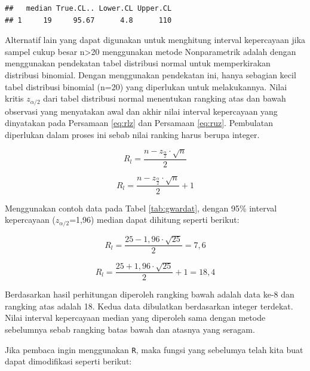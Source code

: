 \documentclass[]{book}
\newenvironment{Shaded}{\begin{snugshade}}{\end{snugshade}}
\newcommand{\KeywordTok}[1]{\textcolor[rgb]{0.13,0.29,0.53}{\textbf{#1}}}
\newcommand{\DataTypeTok}[1]{\textcolor[rgb]{0.13,0.29,0.53}{#1}}
\newcommand{\FloatTok}[1]{\textcolor[rgb]{0.00,0.00,0.81}{#1}}
\newcommand{\OperatorTok}[1]{\textcolor[rgb]{0.81,0.36,0.00}{\textbf{#1}}}
\newcommand{\NormalTok}[1]{#1}
\begin{document}
\begin{Shaded}
\end{Shaded}

\begin{verbatim}
##   median True.CL.. Lower.CL Upper.CL
## 1     19     95.67      4.8      110
\end{verbatim}

Alternatif lain yang dapat digunakan untuk menghitung interval
kepercayaan jika sampel cukup besar n\textgreater{}20 menggunakan metode
Nonparametrik adalah dengan menggunakan pendekatan tabel distribusi
normal untuk memperkirakan distribusi binomial. Dengan menggunakan
pendekatan ini, hanya sebagian kecil tabel distribusi binomial (n=20)
yang diperlukan untuk melakukannya. Nilai kritis \(z_{\alpha/2}\) dari
tabel distribusi normal menentukan rangking atas dan bawah observasi
yang menyatakan awal dan akhir nilai interval kepercayaan yang
dinyatakan pada Persamaan \eqref{eq:rlz} dan Persamaan \eqref{eq:ruz}.
Pembulatan diperlukan dalam proses ini sebab nilai ranking harus berupa
integer.

\begin{equation}
  R_l=\frac{n-z_{\frac{\alpha}{2}}\cdot\sqrt{n}}{2} 
  \label{eq:rlz}
\end{equation}

\begin{equation}
   R_l=\frac{n-z_{\frac{\alpha}{2}}\cdot\sqrt{n}}{2}+1
  \label{eq:ruz}
\end{equation}

Menggunakan contoh data pada Tabel \ref{tab:gwardat}, dengan 95\%
interval kepercayaan (\(z_{\alpha/2}\)=1,96) median dapat dihitung
seperti berikut:

\[
  R_l=\frac{25-1,96\cdot\sqrt{25}}{2}=7,6 
\]

\[
  R_l=\frac{25+1,96\cdot\sqrt{25}}{2}+1=18,4 
\]

Berdasarkan hasil perhitungan diperoleh rangking bawah adalah data ke-8
dan rangking atas adalah 18. Kedua data dibulatkan berdasarkan integer
terdekat. Nilai interval kepercayaan median yang diperoleh sama dengan
metode sebelumnya sebab rangking batas bawah dan atasnya yang seragam.

Jika pembaca ingin menggunakan \texttt{R}, maka fungsi yang sebelumya
telah kita buat dapat dimodifikasi seperti berikut:
\end{document}
